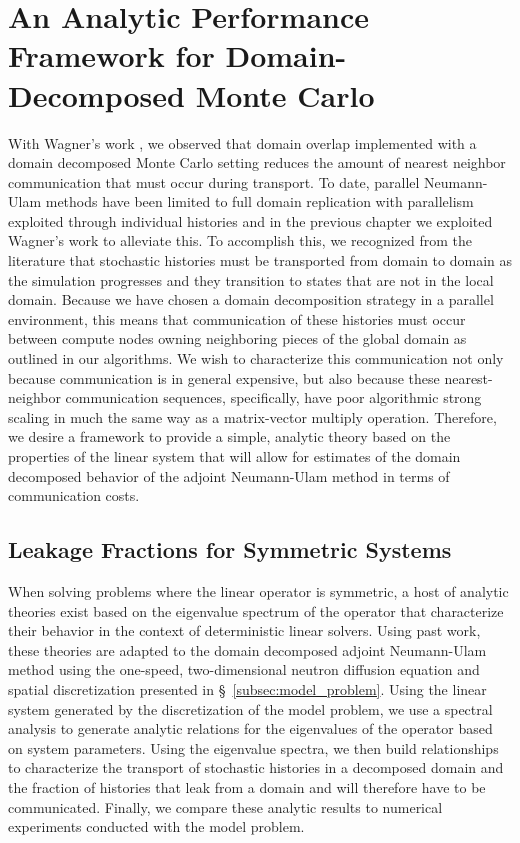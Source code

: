 \section{An Analytic Performance Framework for Domain-Decomposed Monte Carlo}
\label{sec:analytic_framework}
With Wagner's work \citep{wagner_hybrid_2010}, we observed that domain
overlap implemented with a domain decomposed Monte Carlo setting
reduces the amount of nearest neighbor communication that must occur
during transport. To date, parallel Neumann-Ulam methods have been
limited to full domain replication with parallelism exploited through
individual histories \citep{alexandrov_efficient_1998} and in the
previous chapter we exploited Wagner's work to alleviate this. To
accomplish this, we recognized from the literature that stochastic
histories must be transported from domain to domain as the simulation
progresses and they transition to states that are not in the local
domain. Because we have chosen a domain decomposition strategy in a
parallel environment, this means that communication of these histories
must occur between compute nodes owning neighboring pieces of the
global domain as outlined in our algorithms. We wish to characterize
this communication not only because communication is in general
expensive, but also because these nearest-neighbor communication
sequences, specifically, have poor algorithmic strong scaling
\citep{gropp_high-performance_2001} in much the same way as a
matrix-vector multiply operation. Therefore, we desire a framework to
provide a simple, analytic theory based on the properties of the
linear system that will allow for estimates of the domain decomposed
behavior of the adjoint Neumann-Ulam method in terms of communication
costs.

\subsection{Leakage Fractions for Symmetric Systems}
\label{sec:symmetric_leakage_fractions}
When solving problems where the linear operator is symmetric, a host
of analytic theories exist based on the eigenvalue spectrum of the
operator that characterize their behavior in the context of
deterministic linear solvers. Using past work, these theories are
adapted to the domain decomposed adjoint Neumann-Ulam method using the
one-speed, two-dimensional neutron diffusion equation and spatial
discretization presented in \S~\ref{subsec:model_problem}. Using the
linear system generated by the discretization of the model problem, we
use a spectral analysis to generate analytic relations for the
eigenvalues of the operator based on system parameters. Using the
eigenvalue spectra, we then build relationships to characterize the
transport of stochastic histories in a decomposed domain and the
fraction of histories that leak from a domain and will therefore have
to be communicated. Finally, we compare these analytic results to
numerical experiments conducted with the model problem.


